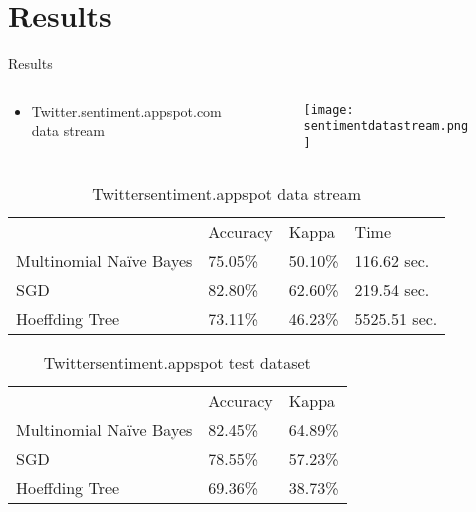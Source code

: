 \section{Results}

\begin{frame}
        \centering
        \huge Results
\end{frame}

\begin{frame}
	\begin{columns}
		\begin{column}{0.3\textwidth}
			\begin{itemize}
				\item Twitter.sentiment.appspot.com data stream
			\end{itemize}
		\end{column}
		\begin{column}{0.7\textwidth}  %
			\begin{figure}
				\centering
				\texttt{[image: sentimentdatastream.png]}
			\end{figure}
		\end{column}
	\end{columns}
\end{frame}

\begin{frame}
	\begin{table}[htb]
		\centering
		\begin{tabular}{llll}
			\multicolumn{1}{c}{} 	& Accuracy 		& Kappa			& Time\\ \cmidrule{1-4}
			Multinomial Naïve Bayes	& \num{75.05}\%	& \num{50.10}\%	& \num{116.62} sec.\\
			SGD						& \num{82.80}\%	& \num{62.60}\%	& \num{219.54} sec.\\
			Hoeffding Tree			& \num{73.11}\%	& \num{46.23}\%	& \num{5525.51} sec.\\ \cmidrule{1-4}
		\end{tabular}
		\caption{Twittersentiment.appspot data stream}
	\end{table}
	\begin{table}[htb]
		\centering
		\begin{tabular}{lll}
			\multicolumn{1}{c}{} 	& Accuracy 		& Kappa\\ \cmidrule{1-3}
			Multinomial Naïve Bayes	& \num{82.45}\%	& \num{64.89}\%\\
			SGD						& \num{78.55}\%	& \num{57.23}\%\\
			Hoeffding Tree			& \num{69.36}\%	& \num{38.73}\%\\ \cmidrule{1-3}
		\end{tabular}
		\caption{Twittersentiment.appspot test dataset}
	\end{table}
\end{frame}


